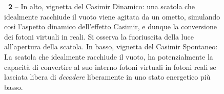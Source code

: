 \begin{figure}[!t]
\begin{center}
\caption{\textbf{\figurename~2} -- In alto, vignetta del Casimir Dinamico: una scatola che idealmente racchiude il vuoto viene agitata da un ometto, simulando così l'aspetto dinamico dell'effetto Casimir, e dunque la conversione dei fotoni virtuali in reali. Si osserva la fuoriuscita della luce all'apertura della scatola.
In basso, vignetta del Casimir Spontaneo: La scatola che idealmente racchiude il vuoto, ha potenzialmente la capacità di convertire al suo interno fotoni virtuali in fotoni reali se lasciata libera di \emph{decadere} liberamente in uno stato energetico più basso.}
\label{fig:Im2}
\end{center}
\vskip-20pt
\end{figure}

% 

